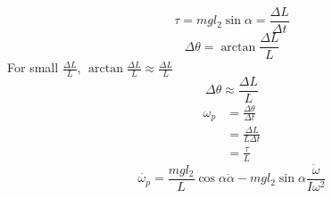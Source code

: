 \documentclass{article}
\begin{document}
\begin{equation}
    \tau = mgl_2\sin\alpha = \frac{\Delta L}{\Delta t}
\end{equation}
\begin{equation*}
    \Delta\theta = \arctan\frac{\Delta L}{L}
\end{equation*}
For small $\frac{\Delta L}{L}$, $\arctan\frac{\Delta L}{L} \approx \frac{\Delta L}{L}$
\begin{equation*}
    \Delta\theta \approx \frac{\Delta L}{L}
\end{equation*}
\begin{align*}
    \omega_p &= \frac{\Delta\theta}{\Delta t}\\
    &= \frac{\Delta L}{L \Delta t}\\
    &= \frac{\tau}{L}
\end{align*}
\begin{equation}
    \dot{\omega_p} = \frac{mgl_2}{L}\cos\alpha\dot{\alpha} - mgl_2\sin\alpha\frac{\dot{\omega}}{I\omega^2}
\end{equation}





\end{document}
